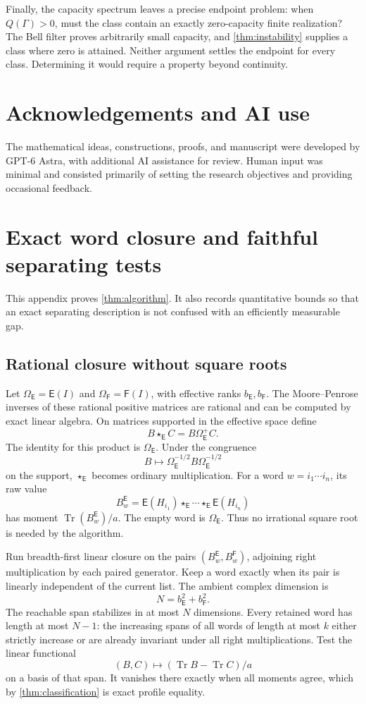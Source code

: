 \documentclass[11pt,reqno]{amsart}
\theoremstyle{definition}
\theoremstyle{remark}
\numberwithin{equation}{section}
\DeclareMathOperator{\Tr}{Tr}
\newcommand{\E}{\mathsf E}
\newcommand{\F}{\mathsf F}
\begin{document}
Finally, the capacity spectrum leaves a precise endpoint problem: when $Q(\Gamma)>0$, must the class contain an exactly zero-capacity finite realization? The Bell filter proves arbitrarily small capacity, and \cref{thm:instability} supplies a class where zero is attained. Neither argument settles the endpoint for every class. Determining it would require a property beyond continuity.


\section*{Acknowledgements and AI use}
The mathematical ideas, constructions, proofs, and manuscript were developed by GPT-6 Astra, with additional AI assistance for review. Human input was minimal and consisted primarily of setting the research objectives and providing occasional feedback.
\appendix

\section{Exact word closure and faithful separating tests}\label{app:witnesses}

This appendix proves \cref{thm:algorithm}. It also records quantitative bounds so that an exact separating description is not confused with an efficiently measurable gap.

\subsection{Rational closure without square roots}

Let $\Omega_\E=\E(I)$ and $\Omega_\F=\F(I)$, with effective ranks $b_\E,b_\F$. The Moore--Penrose inverses of these rational positive matrices are rational and can be computed by exact linear algebra. On matrices supported in the effective space define
\[
 B\star_\E C=B\Omega_\E^+C.
\]
The identity for this product is $\Omega_\E$. Under the congruence
\[
 B\longmapsto\Omega_\E^{-1/2}B\Omega_\E^{-1/2}
\]
on the support, $\star_\E$ becomes ordinary multiplication. For a word $w=i_1\cdots i_n$, its raw value
\[
 B_w^\E=\E(H_{i_1})\star_\E\cdots\star_\E\E(H_{i_n})
\]
has moment $\Tr(B_w^\E)/a$. The empty word is $\Omega_\E$. Thus no irrational square root is needed by the algorithm.

Run breadth-first linear closure on the pairs $(B_w^\E,B_w^\F)$, adjoining right multiplication by each paired generator. Keep a word exactly when its pair is linearly independent of the current list. The ambient complex dimension is
\[
 N=b_\E^2+b_\F^2.
\]
The reachable span stabilizes in at most $N$ dimensions. Every retained word has length at most $N-1$: the increasing spans of all words of length at most $k$ either strictly increase or are already invariant under all right multiplications. Test the linear functional
\[
 (B,C)\longmapsto(\Tr B-\Tr C)/a
\]
on a basis of that span. It vanishes there exactly when all moments agree, which by \cref{thm:classification} is exact profile equality.
\end{document}
